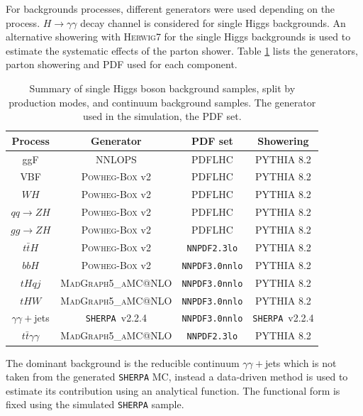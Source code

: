 For backgrounds processes, different generators were used depending on the process. $H\to\gamma\gamma$ decay channel is considered for single Higgs backgrounds. An alternative showering with \textsc{Herwig}7 for the single Higgs backgrounds is used to estimate the systematic effects of the parton shower. Table \ref{tab:HHyybb:Data&MC:Samples} lists the generators, parton showering and PDF used for each component. 
\begin{table}[htbp]
  \centering
    \begin{tabular}{ cccc }
    \hline\hline
    Process & Generator & PDF set  & Showering    \\
       \hline\hline
        ggF  & NNLOPS & PDFLHC &  \textsc{PYTHIA} 8.2  \\
        VBF & \textsc{Powheg-Box} v2 & PDFLHC  &  \textsc{PYTHIA} 8.2        \\
        $WH$ & \textsc{Powheg-Box} v2 & PDFLHC  &  \textsc{PYTHIA} 8.2 \\
        $qq\to ZH$ & \textsc{Powheg-Box} v2 &  PDFLHC  &  \textsc{PYTHIA} 8.2 \\
        $gg\to ZH$ &  \textsc{Powheg-Box} v2 & PDFLHC  &  \textsc{PYTHIA} 8.2  \\
        $t\bar{t}H$ & \textsc{Powheg-Box} v2 & \texttt{NNPDF2.3lo} & \textsc{PYTHIA} 8.2  \\
        $bbH$ &  \textsc{Powheg-Box} v2 & \texttt{NNPDF3.0nnlo}  &  \textsc{PYTHIA} 8.2     \\
        $tHqj$ & \textsc{MadGraph5\_aMC@NLO} &  \texttt{NNPDF3.0nnlo}  & \textsc{PYTHIA} 8.2   \\
        $tHW$  & \textsc{MadGraph5\_aMC@NLO} &  \texttt{NNPDF3.0nnlo}  & \textsc{PYTHIA} 8.2   \\
         $\gamma\gamma+$jets &   \texttt{SHERPA}~v2.2.4 & \texttt{NNPDF3.0nnlo}  &  \texttt{SHERPA}~v2.2.4  \\
         $t\bar{t} \gamma \gamma$ & \textsc{MadGraph5\_aMC@NLO}  &  \texttt{NNPDF2.3lo} & \textsc{PYTHIA} 8.2 \\
        \hline\hline
    \end{tabular}
    \caption{Summary of single Higgs boson background samples, split by production modes, and continuum background samples. The generator used in the simulation, the PDF set. }
  \label{tab:HHyybb:Data&MC:Samples}
\end{table}

The dominant background is the reducible continuum $\gamma\gamma+$jets which is not taken from the generated \texttt{SHERPA} MC, instead a data-driven method is used to estimate its contribution using an analytical function. The functional form is fixed using the simulated \texttt{SHERPA} sample.

